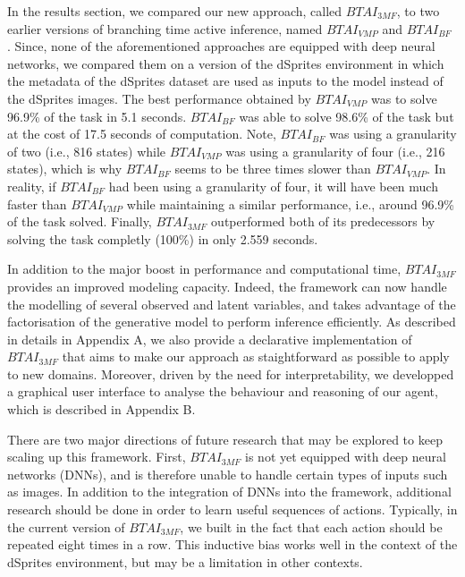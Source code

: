 \documentclass[twoside,11pt]{article}
\begin{document}
In the results section, we compared our new approach, called $BTAI_{3MF}$, to two earlier versions of branching time active inference, named $BTAI_{VMP}$ \citep{AITS_THEORY,AITS_PRACTICE} and $BTAI_{BF}$ \citep{BTAI_BF}. Since, none of the aforementioned approaches are equipped with deep neural networks, we compared them on a version of the dSprites environment in which the metadata of the dSprites dataset are used as inputs to the model instead of the dSprites images. The best performance obtained by $BTAI_{VMP}$ was to solve 96.9\% of the task in 5.1 seconds. $BTAI_{BF}$ was able to solve 98.6\% of the task but at the cost of 17.5 seconds of computation. Note, $BTAI_{BF}$ was using a granularity of two (i.e., 816 states) while $BTAI_{VMP}$ was using a granularity of four (i.e., 216 states), which is why $BTAI_{BF}$ seems to be three times slower than $BTAI_{VMP}$. In reality, if $BTAI_{BF}$ had been using a granularity of four, it will have been much faster than $BTAI_{VMP}$ while maintaining a similar performance, i.e., around 96.9\% of the task solved. Finally, $BTAI_{3MF}$ outperformed both of its predecessors by solving the task completly (100\%) in only 2.559 seconds.

In addition to the major boost in performance and computational time, $BTAI_{3MF}$ provides an improved modeling capacity. Indeed, the framework can now handle the modelling of several observed and latent variables, and takes advantage of the factorisation of the generative model to perform inference efficiently. As described in details in Appendix A, we also provide a declarative implementation of $BTAI_{3MF}$ that aims to make our approach as staightforward as possible to apply to new domains. Moreover, driven by the need for interpretability, we developped a graphical user interface to analyse the behaviour and reasoning of our agent, which is described in Appendix B.

There are two major directions of future research that may be explored to keep scaling up this framework. First, $BTAI_{3MF}$ is not yet equipped with deep neural networks (DNNs), and is therefore unable to handle certain types of inputs such as images. In addition to the integration of DNNs into the framework, additional research should be done in order to learn useful sequences of actions. Typically, in the current version of $BTAI_{3MF}$, we built in the fact that each action should be repeated eight times in a row. This inductive bias works well in the context of the dSprites environment, but may be a limitation in other contexts.
\end{document}
